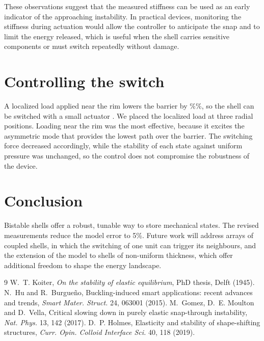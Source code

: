 \documentclass[10pt,twocolumn]{article}
\newcommand{\rev}[2]{\ifdefined\revised #2\else #1\fi}
\begin{document}
These observations suggest that the measured stiffness can be used as an early indicator of the approaching instability. In practical devices, monitoring the stiffness during actuation would allow the controller to anticipate the snap and to limit the energy released, which is useful when the shell carries sensitive components or must switch repeatedly without damage.

\section{Controlling the switch}
A localized load applied near the rim lowers the barrier by
\rev{40\%}{45\%}, so the shell can be switched with a small actuator
\cite{holmes2019}. We placed the localized load at three radial positions. Loading near the rim was the most effective, because it excites the asymmetric mode that provides the lowest path over the barrier. The switching force decreased accordingly, while the stability of each state against uniform pressure was unchanged, so the control does not compromise the robustness of the device.

\section{Conclusion}
Bistable shells offer a robust, tunable way to store mechanical states.
\rev{}{The revised measurements reduce the model error to 5\%. }
Future work will address arrays of coupled shells, in which the switching of one unit can trigger its neighbours, and the extension of the model to shells of non-uniform thickness, which offer additional freedom to shape the energy landscape.

\begin{thebibliography}{9}\small
{} W.~T. Koiter, \emph{On the stability of elastic
equilibrium}, PhD thesis, Delft (1945).
 N.~Hu and R.~Burgue\~no, Buckling-induced smart applications:
recent advances and trends, \emph{Smart Mater. Struct.} 24, 063001 (2015).
 M.~Gomez, D.~E. Moulton and D.~Vella, Critical slowing down
in purely elastic snap-through instability, \emph{Nat. Phys.} 13, 142 (2017).
 D.~P. Holmes, Elasticity and stability of shape-shifting
structures, \emph{Curr. Opin. Colloid Interface Sci.} 40, 118 (2019).
\end{thebibliography}
\end{document}
